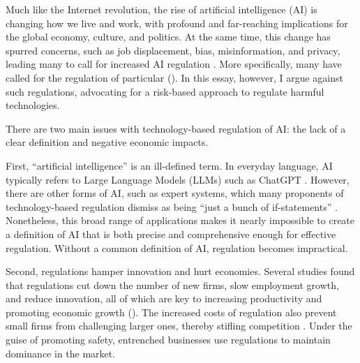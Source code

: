 \documentclass[12pt, a4paper, twoside]{article}
\begin{document}
\maketitle{}

Much like the Internet revolution, the rise of artificial intelligence (AI) is changing how we live and work, with profound and far-reaching implications for the global economy, culture, and politics. At the same time, this change has spurred concerns, such as job displacement, bias, misinformation, and privacy, leading many to call for increased AI regulation \autocite{Meltzer2023USShouldRegulateAI}. More specifically, many have called for the regulation of particular (\cites{Biden2023EOAI}{AUDA-NEPAD2023WhitePaperAI}). In this essay, however, I argue against such regulations, advocating for a risk-based approach to regulate harmful technologies.

There are two main issues with technology-based regulation of AI: the lack of a clear definition and negative economic impacts.

First, “artificial intelligence” is an ill-defined term. In everyday language, AI typically refers to Large Language Models (LLMs) such as ChatGPT \autocite[p.\ 2]{Henman2020ImprovingPublicServicesAI}. However, there are other forms of AI, such as expert systems, which many proponents of technology-based regulation dismiss as being “just a bunch of if-statements” \autocite[p.\ 4]{Braun2024WhyAINotRegulated}. Nonetheless, this broad range of applications makes it nearly impossible to create a definition of AI that is both precise and comprehensive enough for effective regulation. Without a common definition of AI, regulation becomes impractical.

Second, regulations hamper innovation and hurt economies. Several studies found that regulations cut down the number of new firms, slow employment growth, and reduce innovation, all of which are key to increasing productivity and promoting economic growth (\cites[pp.\ 7--11]{BaileyThomas2017RegulatingAwayCompetition}[p.\ 45]{AghionEtAl2023RegulationInnovation}). The increased costs of regulation also prevent small firms from challenging larger ones, thereby stifling competition \autocite{Carney2012RegulationsProtectEntrenched}. Under the guise of promoting safety, entrenched businesses use regulations to maintain dominance in the market.
\end{document}
